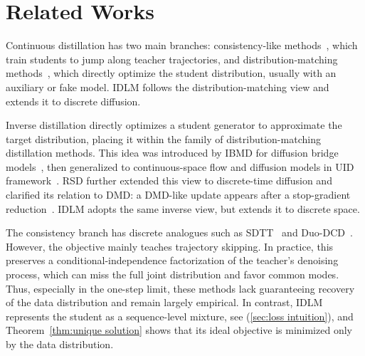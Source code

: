 \vspace{-2mm}
\section{Related Works}
\label{sec:related-works}
    Continuous distillation has two main branches: consistency-like methods~\citep{song2023consistency,song2023improved}, which train students to jump along teacher trajectories, and distribution-matching methods~\citep{yin2024one,yin2024improved,zhou2024score,huang2024flow,gushchin2025inverse,kornilov2025universal, selikhanovych2025one},
    which directly optimize the student distribution, usually with an auxiliary or
    fake model. IDLM follows the distribution-matching view and extends it to
    discrete diffusion.

    Inverse distillation directly optimizes a student generator to approximate the
    target distribution, placing it within the family of distribution-matching
    distillation methods. This idea was introduced by IBMD for diffusion bridge models~\citep{gushchin2025inverse}, then
    generalized to continuous-space flow and diffusion
    models in UID framework~\citep{kornilov2025universal}. RSD further extended this view to
    discrete-time diffusion and clarified its relation to DMD: a DMD-like update
    appears after a stop-gradient reduction~\citep{selikhanovych2025one}. IDLM
    adopts the same inverse view, but extends it to discrete space.

    The consistency branch has discrete analogues such as
    SDTT~\citep{deschenaux2024beyond} and Duo-DCD~\citep{sahoo2025the}. However,
    the objective mainly teaches trajectory skipping. In practice, this preserves a
    conditional-independence factorization of the teacher's denoising process, which
    can miss the full joint distribution and favor common modes. Thus, especially in
    the one-step limit, these methods lack guaranteeing recovery of the data
    distribution and remain largely empirical. In contrast, IDLM represents the
    student as a sequence-level mixture, see (\wasyparagraph\ref{sec:loss intuition}), and Theorem~\ref{thm:unique solution} shows that its ideal
    objective is minimized only by the data distribution.
    \nocite{consistency2024rep, abulkhanov2026unifying}

